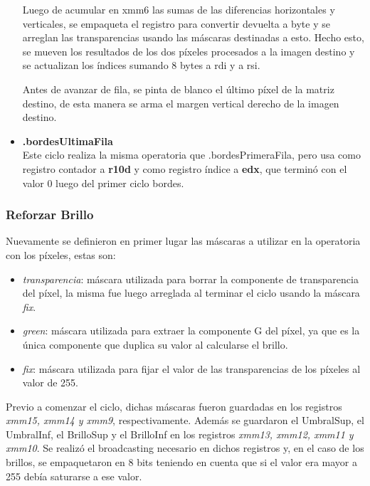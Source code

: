 \documentclass[a4paper]{article}
\begin{document}
\begin{itemize}
	Luego de acumular en xmm6 las sumas de las diferencias horizontales y verticales, se empaqueta el registro para convertir devuelta a byte y se arreglan las transparencias usando las máscaras destinadas a esto. Hecho esto, se mueven los resultados de los dos píxeles procesados a la imagen destino y se actualizan los índices sumando 8 bytes a rdi y a rsi.
	
	Antes de avanzar de fila, se pinta de blanco el último píxel de la matriz destino, de esta manera se arma el margen vertical derecho de la imagen destino.
	\item \textbf{.bordesUltimaFila}\\
	Este ciclo realiza la misma operatoria que .bordesPrimeraFila, pero usa como registro contador a \textbf{r10d} y como registro índice a \textbf{edx}, que terminó con el valor 0 luego del primer ciclo bordes.
\end{itemize}
	



   
\subsubsection{Reforzar Brillo}

\justify
Nuevamente se definieron en primer lugar las máscaras a utilizar en la operatoria con los píxeles, estas son:
\begin{itemize}
	\item \textit{transparencia}: máscara utilizada para borrar la componente de transparencia del píxel, la misma fue luego arreglada al terminar el ciclo usando la máscara \textit{fix}.
	\item \textit{green}: máscara utilizada para extraer la componente G del píxel, ya que es la única componente que duplica su valor al calcularse el brillo.
	\item \textit{fix}: máscara utilizada para fijar el valor de las transparencias de los píxeles al valor de 255.
\end{itemize} 
\justify
Previo a comenzar el ciclo, dichas máscaras fueron guardadas en los registros \textit{xmm15, xmm14 y xmm9}, respectivamente. Además se guardaron el UmbralSup, el UmbralInf, el BrilloSup y el BrilloInf en los registros \textit{xmm13, xmm12, xmm11 y xmm10}. Se realizó el broadcasting necesario en dichos registros y, en el caso de los brillos, se empaquetaron en 8 bits teniendo en cuenta que si el valor era mayor a 255 debía saturarse a ese valor.
\end{document}
